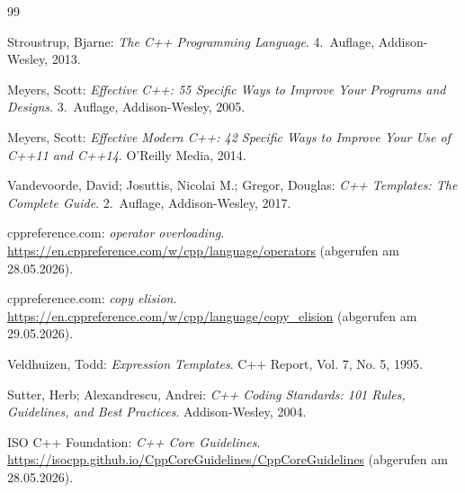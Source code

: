 \documentclass[10pt,a4paper]{article}
\begin{document}
\newpage
\begin{thebibliography}{99}

Stroustrup, Bjarne:
\textit{The C++ Programming Language}. 4.~Auflage, Addison-Wesley, 2013.

Meyers, Scott:
\textit{Effective C++: 55 Specific Ways to Improve Your Programs and Designs}. 3.~Auflage, Addison-Wesley, 2005.

Meyers, Scott:
\textit{Effective Modern C++: 42 Specific Ways to Improve Your Use of C++11 and C++14}. O'Reilly Media, 2014.

Vandevoorde, David; Josuttis, Nicolai M.; Gregor, Douglas:
\textit{C++ Templates: The Complete Guide}. 2.~Auflage, Addison-Wesley, 2017.

cppreference.com:
\textit{operator overloading}. \url{https://en.cppreference.com/w/cpp/language/operators} (abgerufen am 28.05.2026).

cppreference.com:
\textit{copy elision}. \url{https://en.cppreference.com/w/cpp/language/copy_elision} (abgerufen am 29.05.2026).

Veldhuizen, Todd:
\textit{Expression Templates}. C++ Report, Vol. 7, No. 5, 1995.

Sutter, Herb; Alexandrescu, Andrei:
\textit{C++ Coding Standards: 101 Rules, Guidelines, and Best Practices}. Addison-Wesley, 2004.

ISO C++ Foundation:
\textit{C++ Core Guidelines}. \url{https://isocpp.github.io/CppCoreGuidelines/CppCoreGuidelines} (abgerufen am 28.05.2026).

\end{thebibliography}
\end{document}
